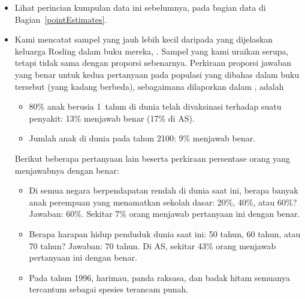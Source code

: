 \begin{itemize}
\item[\ref{hypothesisTesting}]
    Lihat perincian kumpulan data ini sebelumnya,
    pada bagian data di Bagian~\ref{pointEstimates}.
\item[\ref{hypothesisTesting}]
    Kami mencatat sampel yang jauh lebih kecil daripada yang
    dijelaskan keluarga Rosling dalam buku mereka,
    .
    Sampel yang kami uraikan serupa, tetapi tidak
    sama dengan proporsi sebenarnya.
    Perkiraan proporsi jawaban yang benar untuk
    kedua pertanyaan pada populasi yang dibahas dalam buku tersebut
    (yang kadang berbeda), sebagaimana dilaporkan dalam
    ,
    adalah
    \begin{itemize}
    \item
        80\% anak berusia 1~tahun di dunia telah divaksinasi
        terhadap suatu penyakit:
        13\% menjawab benar (17\% di AS).
    \item
        Jumlah anak di dunia pada tahun 2100:
        9\% menjawab benar.
    \end{itemize}
    Berikut beberapa pertanyaan lain beserta perkiraan persentase
    orang yang menjawabnya dengan benar:
    \begin{itemize}
    \item
        Di semua negara berpendapatan rendah di dunia saat ini,
        berapa banyak anak perempuan yang menamatkan sekolah dasar: 20\%, 40\%, atau 60\%?
        Jawaban: 60\%.
        Sekitar 7\% orang menjawab pertanyaan ini dengan benar.
    \item
        Berapa harapan hidup penduduk dunia saat ini:
        50 tahun, 60 tahun, atau 70 tahun?
        Jawaban: 70 tahun.
        Di AS, sekitar 43\% orang menjawab pertanyaan ini dengan benar.
    \item
        Pada tahun 1996, harimau, panda raksasa, dan badak hitam
        semuanya tercantum sebagai spesies terancam punah.

\end{itemize}
\end{itemize}
